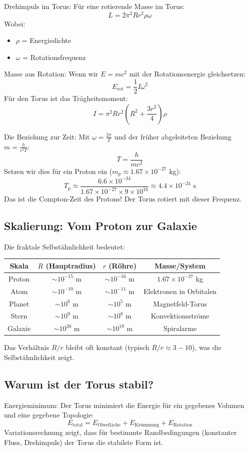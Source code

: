 \documentclass[12pt,a4paper]{article}
\begin{document}
	Drehimpuls im Torus:
	Für eine rotierende Masse im Torus:
	\[
	L = 2\pi^2 R r^2 \rho \omega
	\]
	Wobei:
	\begin{itemize}
		\item \( \rho \) = Energiedichte
		\item \( \omega \) = Rotationsfrequenz
	\end{itemize}
	
	Masse aus Rotation:
	Wenn wir \( E = mc^2 \) mit der Rotationsenergie gleichsetzen:
	\[
	E_{\text{rot}} = \frac{1}{2} I \omega^2
	\]
	Für den Torus ist das Trägheitsmoment:
	\[
	I = \pi^2 R r^2 \left(R^2 + \frac{3r^2}{4}\right) \rho
	\]
	
	Die Beziehung zur Zeit:
	Mit \( \omega = \frac{2\pi}{T} \) und der früher abgeleiteten Beziehung \( m = \frac{h}{c^2 T} \):
	\[
	T = \frac{h}{mc^2}
	\]
	Setzen wir dies für ein Proton ein (\( m_p \approx 1.67 \times 10^{-27} \) kg):
	\[
	T_p \approx \frac{6.6 \times 10^{-34}}{1.67 \times 10^{-27} \times 9 \times 10^{16}} \approx 4.4 \times 10^{-24} \text{ s}
	\]
	Das ist die Compton-Zeit des Protons! Der Torus rotiert mit dieser Frequenz.
	
	\subsection{Skalierung: Vom Proton zur Galaxie}
	Die fraktale Selbstähnlichkeit bedeutet:
	\begin{table}[H]
		\centering
		\begin{tabular}{|c|c|c|c|}
			\hline
			Skala & \( R \) (Hauptradius) & \( r \) (Röhre) & Masse/System \\
			\hline
			Proton & \( \sim 10^{-15} \) m & \( \sim 10^{-16} \) m & \( 1.67 \times 10^{-27} \) kg \\
			Atom & \( \sim 10^{-10} \) m & \( \sim 10^{-11} \) m & Elektronen in Orbitalen \\
			Planet & \( \sim 10^{6} \) m & \( \sim 10^{5} \) m & Magnetfeld-Torus \\
			Stern & \( \sim 10^{9} \) m & \( \sim 10^{8} \) m & Konvektionsströme \\
			Galaxie & \( \sim 10^{20} \) m & \( \sim 10^{19} \) m & Spiralarme \\
			\hline
		\end{tabular}
	\end{table}
	Das Verhältnis \( R/r \) bleibt oft konstant (typisch \( R/r \approx 3-10 \)), was die Selbstähnlichkeit zeigt.
	
	\subsection{Warum ist der Torus stabil?}
	Energieminimum:
	Der Torus minimiert die Energie für ein gegebenes Volumen und eine gegebene Topologie:
	\[
	E_{\text{total}} = E_{\text{Oberfläche}} + E_{\text{Krümmung}} + E_{\text{Rotation}}
	\]
	Variationsrechnung zeigt, dass für bestimmte Randbedingungen (konstanter Fluss, Drehimpuls) der Torus die stabilste Form ist.
	
\end{document}
